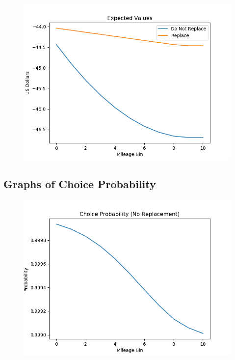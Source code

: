 \documentclass{article}
\begin{document}
\begin{figure}[h]
  \centering
    \includegraphics[width=1.0\textwidth]{Figure_1}
\end{figure}
\FloatBarrier

\subsection{Graphs of Choice Probability}

\begin{figure}[h]
  \centering
    \includegraphics[width=1.0\textwidth]{Figure_2}
\end{figure}
\FloatBarrier
\end{document}
